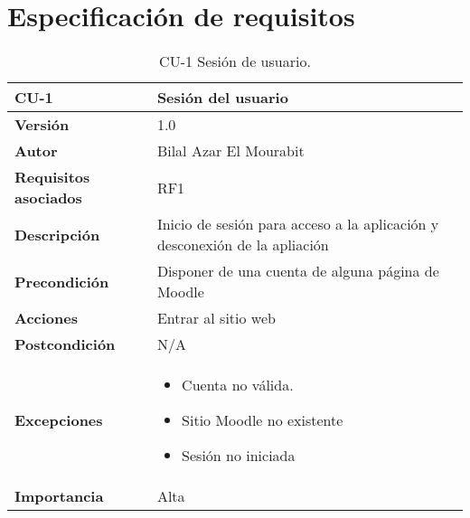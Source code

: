 \section{Especificación de requisitos}

\begin{table}[H]
	\centering
	\begin{tabularx}{\linewidth}{ p{} p{}}
		\toprule
		\textbf{CU-1}    & \textbf{Sesión del usuario}\\
		\toprule
		\textbf{Versión}              & 1.0    \\
		\textbf{Autor}                & Bilal Azar El Mourabit \\
		\textbf{Requisitos asociados} & RF1 \\
		\textbf{Descripción}          & Inicio de sesión para acceso a la aplicación y desconexión de la apliación \\
    		\textbf{Precondición}         & Disponer de una cuenta de alguna página de Moodle \\
		\textbf{Acciones}             & Entrar al sitio web\\
		\textbf{Postcondición}        & N/A \\
		\textbf{Excepciones}          & \begin{itemize}
		    \item Cuenta no válida.
            \item Sitio Moodle no existente
            \item Sesión no iniciada
		\end{itemize}\\
		\textbf{Importancia}          & Alta \\
		\bottomrule
	\end{tabularx}
	\caption{CU-1 Sesión de usuario.}
\end{table}

